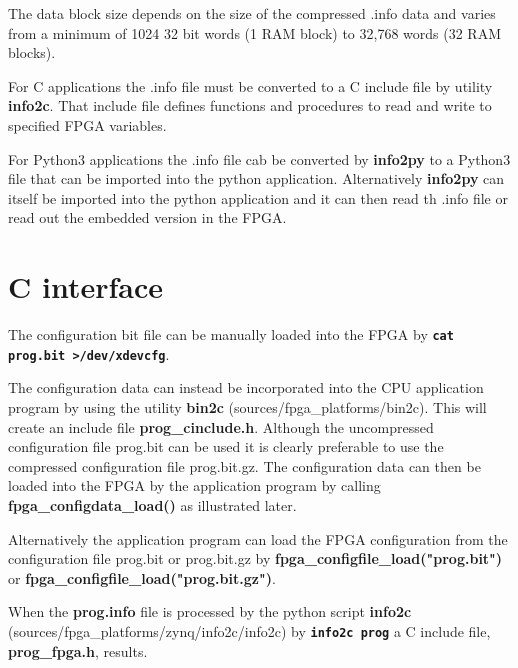     The data block size depends on the size of the compressed .info data and
    varies from a minimum of 1024 32 bit words (1 RAM block) to 32,768 words (32
    RAM blocks).

    For C applications the .info file must be converted to a C include file by
    utility {\bf info2c}. That include file defines functions and procedures to
    read and write to specified FPGA variables.

    For Python3 applications the .info file cab be converted by {\bf info2py} to
    a Python3 file that can be imported into the python application.
    Alternatively {\bf info2py} can itself be imported into the python application
    and it can then read th .info file or read out the embedded version in
    the FPGA.
    
    \section{C interface}
    
        The configuration bit file can be manually loaded into the FPGA
        by {\bf \verb'cat prog.bit >/dev/xdevcfg'}.
    
        The configuration data can instead be incorporated into the CPU
        application program by using the utility {\bf bin2c}
        (sources/fpga\_platforms/bin2c). This will create an include file {\bf
        prog\_cinclude.h}. Although the uncompressed configuration file prog.bit
        can be used it is clearly preferable to use the compressed configuration
        file prog.bit.gz. The configuration data can then be loaded into the FPGA
        by the application program by calling {\bf fpga\_configdata\_load()} as
        illustrated later.
        
        Alternatively the application program can load the FPGA configuration
        from the configuration file prog.bit or prog.bit.gz by {\bf
        fpga\_configfile\_load("prog.bit")} or {\bf
        fpga\_configfile\_load("prog.bit.gz")}.
    
        When the {\bf prog.info} file is processed by the python script {\bf
        info2c} (sources/fpga\_platforms/zynq/info2c/info2c) by {\bf
        \verb'info2c prog'} a C include file, {\bf prog\_fpga.h}, results.

